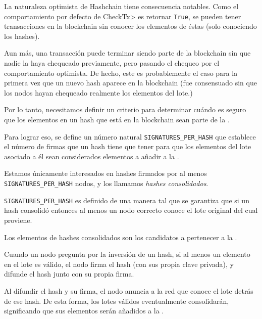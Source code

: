 %
La naturaleza optimista de Hashchain tiene consecuencia notables.
%
Como el comportamiento por defecto de  \<CheckTx> es retornar \texttt{True},
se pueden tener transacciones en la blockchain sin conocer los elementos de éstas
(solo conociendo los hashes).

%
Aun más, una transacción puede terminar siendo parte de la blockchain sin que nadie
la haya chequeado previamente, pero pasando el chequeo por el comportamiento optimista.
%
De hecho, este es probablemente el caso para la primera vez que un nuevo hash aparece
en la blockchain (fue consensuado sin que los nodos hayan chequeado realmente los elementos
del lote.)

%

Por lo tanto, necesitamos definir un criterio para determinar cuándo es seguro
que los elementos en un hash que está en la blockchain sean parte de la \setchain.

%
Para lograr eso, se define un número natural \texttt{SIGNATURES\_PER\_HASH} que establece
el número de firmas que un hash tiene que tener para que los elementos del lote asociado a él
sean considerados elementos a añadir a la \setchain.

%
Estamos únicamente interesados en hashes firmados por al menos \texttt{SIGNATURES\_PER\_HASH}
nodos, y los llamamos \textit{hashes consolidados}.

\texttt{SIGNATURES\_PER\_HASH} es definido de una manera tal que se garantiza que si un hash
consolidó entonces al menos un nodo correcto conoce el lote original del cual proviene.

%
Los elementos de hashes consolidados son los candidatos a pertenecer a la \setchain.

%
Cuando un nodo pregunta por la inversión de un hash, si al menos un elemento en el lote
es válido, el nodo firma el hash (con sus propia clave privada), y difunde el hash junto
con su propia firma.

%
Al difundir el hash y su firma, el nodo anuncia a la red que conoce el lote detrás de ese hash.
%
De esta forma, los lotes válidos eventualmente consolidarán, significando que sus elementos
serán añadidos a la \setchain.

